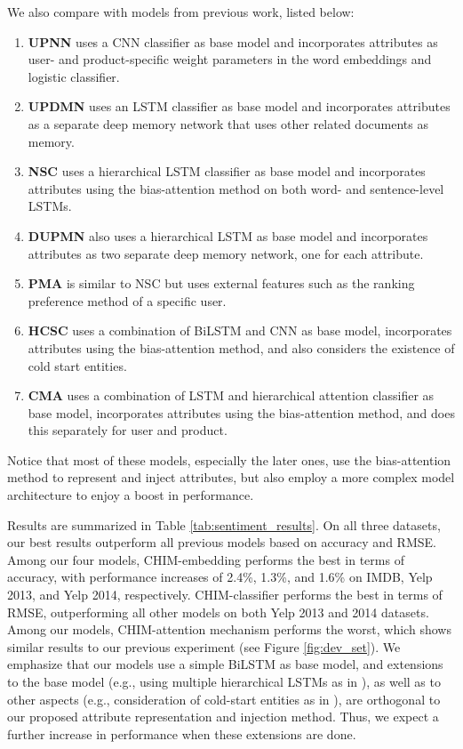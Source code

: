 \documentclass[11pt,a4paper]{article}
\begin{document}
We also compare with models from previous work, listed below: 

\begin{enumerate}
    \item \textbf{UPNN} \cite{tang2015learning} uses a CNN classifier as base model and incorporates attributes as user- and product-specific weight parameters in the word embeddings and logistic classifier.
    \item \textbf{UPDMN} \cite{dou2017capturing} uses an LSTM classifier as base model and incorporates attributes as a separate deep memory network that uses other related documents as memory.
    \item \textbf{NSC} \cite{chen2016neural} uses a hierarchical LSTM classifier as base model and incorporates attributes using the bias-attention method on both word- and sentence-level LSTMs.
    \item \textbf{DUPMN} \cite{long2018dual} also uses a hierarchical LSTM as base model and incorporates attributes as two separate deep memory network, one for each attribute.
    \item \textbf{PMA} \cite{zhu2017parallel} is similar to NSC but uses external features such as the ranking preference method of a specific user.
    \item \textbf{HCSC} \cite{amplayo2018cold} uses a combination of BiLSTM and CNN as base model, incorporates attributes using the bias-attention method, and also considers the existence of cold start entities.
    \item \textbf{CMA} \cite{ma2017cascading} uses a combination of LSTM and hierarchical attention classifier as base model, incorporates attributes using the bias-attention method, and does this separately for user and product.
\end{enumerate}

Notice that most of these models, especially the later ones, use the bias-attention method to represent and inject attributes, but also employ a more complex model architecture to enjoy a boost in performance.

Results are summarized in Table \ref{tab:sentiment_results}. On all three datasets, our best results outperform all previous models based on accuracy and RMSE. Among our four models, CHIM-embedding performs the best in terms of accuracy, with performance increases of 2.4\%, 1.3\%, and 1.6\% on IMDB, Yelp 2013, and Yelp 2014, respectively. CHIM-classifier performs the best in terms of RMSE, outperforming all other models on both Yelp 2013 and 2014 datasets. Among our models, CHIM-attention mechanism performs the worst, which shows similar results to our previous experiment (see Figure \ref{fig:dev_set}).
We emphasize that our models use a simple BiLSTM as base model, and extensions to the base model (e.g., using multiple hierarchical LSTMs as in \citealt{wu2018improving}), as well as to other aspects (e.g., consideration of cold-start entities as in \citealt{amplayo2018cold}), are orthogonal to our proposed attribute representation and injection method. Thus, we expect a further increase in performance when these extensions are done.
\end{document}
